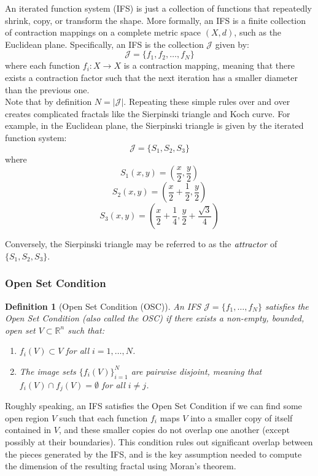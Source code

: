 \documentclass{article}
\newtheorem{definition}{Definition}
\begin{document}
An iterated function system (IFS) is just a collection of functions that repeatedly shrink, copy, or transform the shape. More formally, an IFS is a finite collection of contraction mappings on a complete metric space $(X, d)$, such as the Euclidean plane. Specifically, an IFS is the collection $\mathcal{J}$ given by:
\[
\mathcal{J} = \{f_1, f_2, \dots, f_N\}
\]
where each function $f_i:X \to X$ is a contraction mapping, meaning that there exists a contraction factor such that the next iteration has a smaller diameter than the previous one. \\

Note that by definition $N = |\mathcal{J}|$. Repeating these simple rules over and over creates complicated fractals like the Sierpinski triangle and Koch curve. For example, in the Euclidean plane, the Sierpinski triangle is given by the iterated function system:
$$\mathcal{J} = \{S_1, S_2, S_3\}$$
where 
$$S_1(x,y) = \left(\frac{x}{2}, \frac{y}{2} \right)$$
$$S_2(x,y) = \left(\frac{x}{2} + \frac{1}{2}, \frac{y}{2} \right)$$
$$S_3(x,y) = \left(\frac{x}{2} + \frac{1}{4}, \frac{y}{2} + \frac{\sqrt{3}}{4} \right)$$

Conversely, the Sierpinski triangle may be referred to as the $\emph{attractor}$ of $\{S_1,S_2,S_3\}$.




\subsubsection{Open Set Condition}

\begin{definition}[Open Set Condition (OSC)]
An IFS $\mathcal{J} = \{f_1, \dots, f_N\}$ satisfies the Open Set Condition (also called the OSC) if there exists a non-empty, bounded, open set $V \subset \mathbb{R}^n$ such that:
\begin{enumerate}
    \item $f_i(V) \subset V$ for all $i = 1, \dots, N$.
    \item The image sets $\{f_i(V)\}_{i=1}^N$ are pairwise disjoint, meaning that $f_i(V) \cap f_j(V) = \emptyset$ for all $i \neq j$.
\end{enumerate}
\end{definition}

\vspace{0.5em}

Roughly speaking, an IFS satisfies the Open Set Condition if we can find some open region $V$ such that each function $f_i$ maps $V$ into a smaller copy of itself contained in $V$, and these smaller copies do not overlap one another (except possibly at their boundaries). This condition rules out significant overlap between the pieces generated by the IFS, and is the key assumption needed to compute the dimension of the resulting fractal using Moran's theorem. \\
\end{document}
